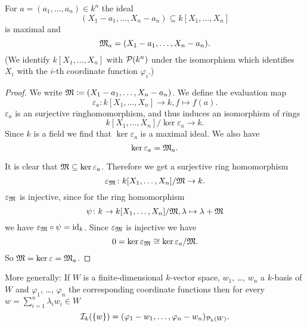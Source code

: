 \begin{lem}
  For $a = (a_1, \dotsc, a_n) \in k^n$ the ideal
  \[
              (X_1 - a_1, \dotsc, X_n - a_n)
    \subseteq k[X_1, \dotsc, X_n]
  \]
  is maximal and
  \[
    \mathfrak{M}_a = (X_1 - a_1, \dotsc, X_n - a_n).
  \]
  (We identify $k[X_1, \dotsc, X_n]$ with $\mathcal{P}(k^n)$ under the isomorphism which identifies $X_i$ with the $i$-th coordinate function $\varphi_i$.)
\end{lem}
\begin{proof}
  We write $\mathfrak{M} \coloneqq (X_1 - a_1, \dotsc, X_n - a_n)$. We define the evaluation map
  \[
            \varepsilon_a
    \colon  k[X_1, \dotsc, X_n]
    \to     k,
            f
    \mapsto f(a).
  \]
  $\varepsilon_a$ is an surjective ringhomomorphism, and thus induces an isomorphism of rings
  \[
        k[X_1, \dotsc, X_n] / \ker \varepsilon_a
    \to k.
  \]
  Since $k$ is a field we find that $\ker \varepsilon_a$ is a maximal ideal. We also have
  \[
      \ker \varepsilon_a
    = \mathfrak{M}_a.
  \]
  
  It is clear that $\mathfrak{M} \subseteq \ker \varepsilon_a$. Therefore we get a surjective ring homomorphism
  \[
            \varepsilon_\mathfrak{M}
    \colon  k[X_1, \dotsc, X_n] / \mathfrak{M}
    \to     k.
  \]
  $\varepsilon_\mathfrak{M}$ is injective, since for the ring homomorphism
  \[
            \psi
    \colon  k
    \to     k[X_1, \dotsc, X_n] / \mathfrak{M},
            \lambda
    \mapsto \lambda + \mathfrak{M}
  \]
  we have $\varepsilon_\mathfrak{M} \circ \psi = \operatorname{id}_k$. Since $\varepsilon_\mathfrak{M}$ is injective we have
  \[
          0
    =     \ker \varepsilon_\mathfrak{M}
    \cong \ker \varepsilon_a / \mathfrak{M}.
  \]
  So $\mathfrak{M} = \ker \varepsilon = \mathfrak{M}_a$.
\end{proof}

More generally:
If $W$ is a finite-dimensional $k$-vector space, $w_1$, \dots, $w_n$ a $k$-basis of $W$ and $\varphi_1$, \dots, $\varphi_n$ the corresponding coordinate functions then for every $w = \sum_{i=1}^n \lambda_i w_i \in W$
\[
    \mathcal{I}_k(\{w\})
  = ( \varphi_1 - w_1, \dotsc, \varphi_n - w_n )_{\mathcal{P}_k(W)}.
\]


